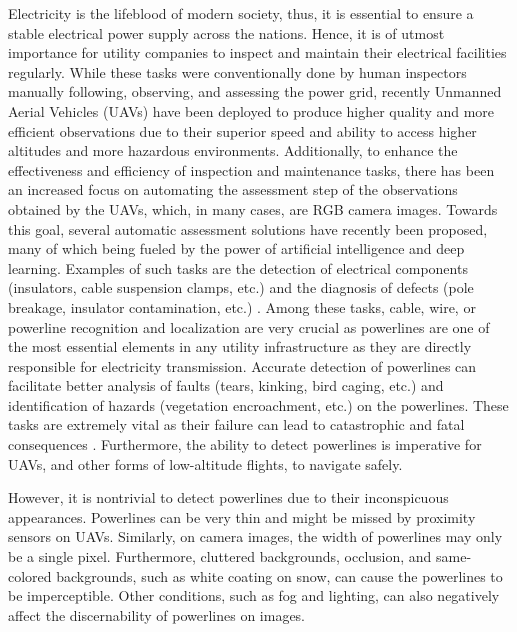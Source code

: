 \documentclass[journal]{IEEEtran}
\begin{document}
Electricity is the lifeblood of modern society, thus, it is essential to ensure a stable electrical power supply across the nations. Hence, it is of utmost importance for utility companies to inspect and maintain their electrical facilities regularly. While these tasks were conventionally done by human inspectors manually following, observing, and assessing the power grid, recently Unmanned Aerial
Vehicles (UAVs) have been deployed to produce higher quality and more efficient observations due to their superior speed and ability to access higher altitudes and more hazardous environments. Additionally, to enhance the effectiveness and efficiency of inspection and maintenance tasks, there has been an increased focus on automating the assessment step of the observations obtained by the UAVs, which, in many cases, are RGB camera images. Towards this goal, several automatic assessment solutions have recently been proposed, many of which being fueled by the power of artificial intelligence and deep learning. Examples of such tasks are the detection of electrical components (insulators, cable suspension clamps, etc.) and the diagnosis of defects (pole breakage, insulator contamination, etc.) \cite{nhan_examples, insulator_examples,detect_component_examples}. Among these tasks, cable, wire, or powerline recognition and localization are very crucial as powerlines are one of the most essential elements in any utility infrastructure as they are directly responsible for electricity transmission. Accurate detection of powerlines can facilitate better analysis of faults (tears, kinking, bird caging, etc.) and identification of hazards (vegetation encroachment, etc.) on the powerlines. These tasks are extremely vital as their failure can lead to catastrophic and fatal consequences \cite{pge_bankruptcy}. Furthermore, the ability to detect powerlines is imperative for UAVs, and other forms of low-altitude flights, to navigate safely.

However, it is nontrivial to detect powerlines due to their inconspicuous appearances. Powerlines can be very thin and might be missed by proximity sensors on UAVs. Similarly, on camera images, the width of powerlines may only be a single pixel. Furthermore, cluttered backgrounds, occlusion, and same-colored backgrounds, such as white coating on snow, can cause the powerlines to be imperceptible. Other conditions, such as fog and lighting, can also negatively affect the discernability of powerlines on images. 
\end{document}
